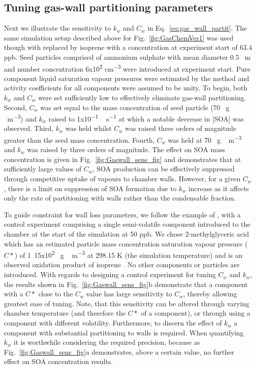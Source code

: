 \documentclass[gmd, manuscript]{copernicus}
\begin{document}
\subsection{Tuning gas-wall partitioning parameters}

Next we illustrate the sensitivity to $k_{w}$ and $C_{w}$ in Eq.~\ref{eq:gas_wall_partit}.  The same simulation setup described above for Fig.~\ref{fig:GasChemVer1} was used though with  replaced by isoprene with a concentration at experiment start of 63.4 \unit{ppb}.  Seed particles comprised of ammonium sulphate with mean diameter 0.5 \unit{\mu m} and number concentration \unit{6x10^{2}} \unit{cm^{-3}} were introduced at experiment start.  Pure component liquid saturation vapour pressures were estimated by the \citet{Nannoolal2008} method and activity coefficients for all components were assumed to be unity.  To begin, both $k_{w}$ and $C_{w}$ were set sufficiently low to effectively eliminate gas-wall partitioning.  Second, $C_{w}$ was set equal to the mass concentration of seed particle (70 \unit{\mu g\,m^{-3}}) and $k_{w}$ raised to \unit{1x10^{-1}\, s^{-1}} at which a notable decrease in [SOA] was observed.  Third, $k_{w}$ was held whilst $C_{w}$ was raised three orders of magnitude greater than the seed mass concentration.  Fourth, $C_{w}$ was held at 70 \unit{\mu g\,m^{-3}} and $k_{w}$ was raised by three orders of magnitude.  The effect on SOA mass concentration is given in Fig.~\ref{fig:Gaswall_sens_fig} and demonstrates that at sufficiently large values of $C_{w}$, SOA production can be effectively suppressed through competitive uptake of vapours to chamber walls.  However, for a given $C_{w}$, there is a limit on suppression of SOA formation due to $k_{w}$ increase as it affects only the rate of partitioning with walls rather than the condensable fraction.

To guide constraint for wall loss parameters, we follow the example of \citet{Matsunaga2010}, with a control experiment comprising a single semi-volatile component introduced to the chamber at the start of the simulation at 50 ppb.  We chose 2-methylglyceric acid which has an estimated particle mass concentration saturation vapour pressure ($C*$) of \unit{1.15x10^2} \unit{\mu g\,m^{-3}} at 298.15 K (the simulation temperature) and is an observed oxidation product of isoprene \citep{Surratt2006}.  No other components or particles are introduced.  With regards to designing a control experiment for tuning $C_{w}$ and $k_{w}$, the results shown in Fig.~\ref{fig:Gaswall_sens_fig}b demonstrate that a component with a $C*$ close to the $C_{w}$ value has large sensitivity to $C_{w}$, thereby allowing greatest ease of tuning.  Note, that this sensitivity can be altered through varying chamber temperature (and therefore the $C*$ of a component), or through using a component with different volatility.  Furthermore, to discern the effect of $k_{w}$ a component with substantial partitioning to walls is required.  When quantifying $k_{w}$ it is worthwhile considering the required precision, because as Fig.~\ref{fig:Gaswall_sens_fig}a demonstrates, above a certain value, no further effect on SOA concentration results.
\end{document}

